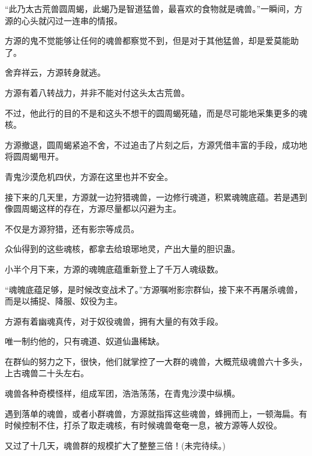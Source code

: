 \begin{this_body}
“此乃太古荒兽圆周蝎，此蝎乃是智道猛兽，最喜欢的食物就是魂兽。”一瞬间，方源的心头就闪过一连串的情报。

方源的鬼不觉能够让任何的魂兽都察觉不到，但是对于其他猛兽，却是爱莫能助了。

舍弃祥云，方源转身就逃。

方源有着八转战力，并非不能对付这头太古荒兽。

不过，他此行的目的不是和这头不想干的圆周蝎死磕，而是尽可能地采集更多的魂核。

方源撤退，圆周蝎紧追不舍，不过追击了片刻之后，方源凭借丰富的手段，成功地将圆周蝎甩开。

青鬼沙漠危机四伏，方源在这里也并不安全。

接下来的几天里，方源就一边狩猎魂兽，一边修行魂道，积累魂魄底蕴。若是遇到像圆周蝎这样的存在，方源尽量都以闪避为主。

不仅是方源狩猎，还有影宗等成员。

众仙得到的这些魂核，都拿去给琅琊地灵，产出大量的胆识蛊。

小半个月下来，方源的魂魄底蕴重新登上了千万人魂级数。

“魂魄底蕴足够，是时候改变战术了。”方源嘱咐影宗群仙，接下来不再屠杀魂兽，而是以捕捉、降服、奴役为主。

方源有着幽魂真传，对于奴役魂兽，拥有大量的有效手段。

唯一制约他的，只有魂道、奴道仙蛊稀缺。

在群仙的努力之下，很快，他们就掌控了一大群的魂兽，大概荒级魂兽六十多头，上古魂兽二十头左右。

魂兽各种奇模怪样，组成军团，浩浩荡荡，在青鬼沙漠中纵横。

遇到落单的魂兽，或者小群魂兽，方源就指挥这些魂兽，蜂拥而上，一顿海扁。有时候控制不住，打杀了取走魂核，有时候魂兽奄奄一息，被方源等人奴役。

又过了十几天，魂兽群的规模扩大了整整三倍！(未完待续。)

\end{this_body}

